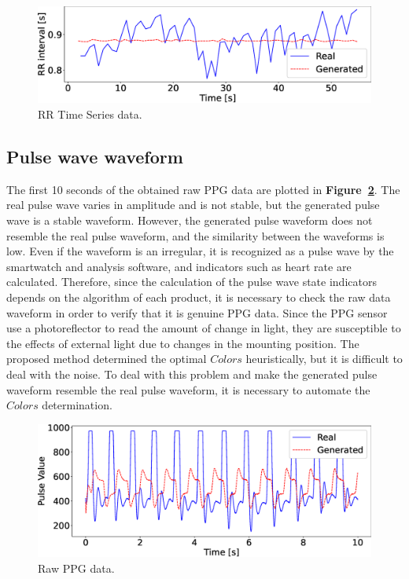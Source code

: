 \documentclass[sigchi,authordraft]{acmart}
\newcommand\figref[1]{\textbf{Figure~\ref{fig:#1}}}
\begin{document}
\begin{figure}[!t]
  \centering
  \includegraphics[width=0.8\linewidth]{figures/rr_wave.eps}
  \caption{RR Time Series data.}
  \label{fig:rr_wave}
\end{figure}


\subsection{Pulse wave waveform}
The first 10 seconds of the obtained raw PPG data are plotted in \figref{raw_wave}. The real pulse wave varies in amplitude and is not stable, but the generated pulse wave is a stable waveform. However, the generated pulse waveform does not resemble the real pulse waveform, and the similarity between the waveforms is low. Even if the waveform is an irregular, it is recognized as a pulse wave by the smartwatch and analysis software, and indicators such as heart rate are calculated. Therefore, since the calculation of the pulse wave state indicators depends on the algorithm of each product, it is necessary to check the raw data waveform in order to verify that it is genuine PPG data. Since the PPG sensor use a photoreflector to read the amount of change in light, they are susceptible to the effects of external light due to changes in the mounting position. The proposed method determined the optimal $Colors$ heuristically, but it is difficult to deal with the noise. To deal with this problem and make the generated pulse waveform resemble the real pulse waveform, it is necessary to automate the $Colors$ determination.

\begin{figure}[!t]
  \centering
  \includegraphics[width=0.8\linewidth]{figures/raw_wave.eps}
  \caption{Raw PPG data.}
  \label{fig:raw_wave}
\end{figure}
\end{document}
